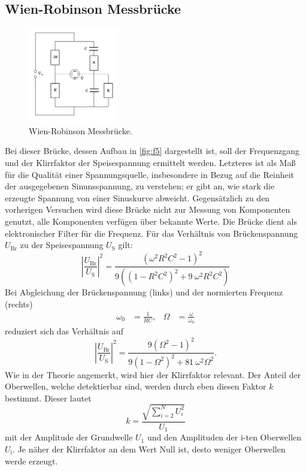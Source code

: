 \subsection{Wien-Robinson Messbrücke}
\begin{figure}[H]
    \centering
        \centering
        \includegraphics[width=0.35\textwidth]{Bilder/wien_robinson.png}
        \caption{Wien-Robinson Messbrücke. \cite{anleitung}}
    \hfill
    \label{fig:f5}
\end{figure}
Bei dieser Brücke, dessen Aufbau in \autoref{fig:f5} dargestellt ist, soll der 
Frequenzgang und der Klirrfaktor der Speisespannung ermittelt werden. Letzteres 
ist als Maß für die Qualität einer Spannungsquelle, insbesondere in Bezug auf 
die Reinheit der ausgegebenen Sinunsspannung, zu verstehen; er gibt an, wie 
stark die erzeugte Spannung von einer Sinuskurve abweicht. Gegensätzlich zu 
den vorherigen Versuchen wird diese Brücke nicht zur Messung von Komponenten 
genutzt, alle Komponenten verfügen über bekannte Werte. Die Brücke dient als 
elektronischer Filter für die Frequenz. Für das Verhältnis von Brückenspannung 
$U_{\text{Br}}$ zu der Speisespannung $U_{\text{S}}$ gilt:
\begin{equation}
    \left|\frac{U_{\text{Br}}}{U_{\text{S}}}\right|^2 = \frac{(\omega ^2 R^2 C^2 -1)^2}{9((1-R^2 C^2)^2+9 \: \omega ^2 R^2 C^2)}
\end{equation}
Bei Abgleichung der Brückenspannung (links) und der normierten Frequenz (rechts)
\begin{equation}
    \begin{aligned}
        \omega_0 &= \frac{1}{RC}, & \Omega &= \frac{\omega}{\omega_0}
    \end{aligned}
\end{equation}
reduziert sich das Verhältnis auf 
\begin{equation}
    \label{eqn:omega}
    \left|\frac{U_{\text{Br}}}{U_{\text{S}}}\right|^2 = \frac{9(\Omega ^2 -1)^2}{9(1-\Omega^2)^2+81 \: \omega ^2 \Omega^2}.
\end{equation}
Wie in der Theorie angemerkt, wird hier der Klirrfaktor relevant. Der Anteil der 
Oberwellen, welche detektierbar sind, werden durch eben diesen Faktor $k$ bestimmt. 
Dieser lautet
\begin{equation}
    \label{eqn:Klirrfaktor}
    k = \frac{\sqrt{\sum\limits_{i=2}^N U_i^2}}{U_1}
\end{equation}
mit der Amplitude der Grundwelle $U_1$ und den Amplituden der i-ten Oberwellen 
$U_\text{i}$. Je näher der Klirrfaktor an dem Wert Null ist, desto weniger Oberwellen 
werde erzeugt.